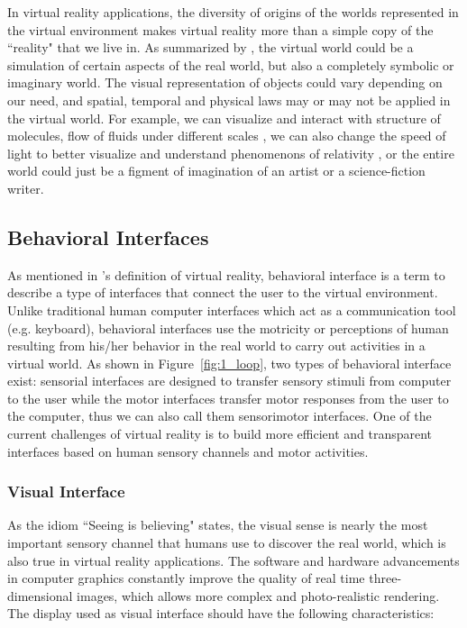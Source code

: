 In virtual reality applications, the diversity of origins of the worlds represented in the virtual environment makes virtual reality more than a simple copy of the ``reality" that we live in. As summarized by \citet{Fuchs2011Book}, the virtual world could be a simulation of certain aspects of the real world, but also a completely symbolic or imaginary world. The visual representation of objects could vary depending on our need, and spatial, temporal and physical laws may or may not be applied in the virtual world. For example, we can visualize and interact with structure of molecules, flow of fluids under different scales \citep{Ferey2009Multisensory, Bryson1996Virtual}, we can also change the speed of light to better visualize and understand phenomenons of relativity \citep{Doat2011NRP}, or the entire world could just be a figment of imagination of an artist or a science-fiction writer.


\subsection{Behavioral Interfaces}
As mentioned in \citet{Fuchs2011Book}'s definition of virtual reality, behavioral interface is a term to describe a type of interfaces that connect the user to the virtual environment. Unlike traditional human computer interfaces which act as a communication tool (e.g. keyboard), behavioral interfaces use the motricity or perceptions of human resulting from his/her behavior in the real world to carry out activities in a virtual world. As shown in Figure~\ref{fig:1_loop}, two types of behavioral interface exist: sensorial interfaces are designed to transfer sensory stimuli from computer to the user while the motor interfaces transfer motor responses from the user to the computer, thus we can also call them sensorimotor interfaces. One of the current challenges of virtual reality is to build more efficient and transparent interfaces based on human sensory channels and motor activities.

\subsubsection{Visual Interface}
\label{sec:visual_interface}
As the idiom ``Seeing is believing" states, the visual sense is nearly the most important sensory channel that humans use to discover the real world, which is also true in virtual reality applications. The software and hardware advancements in computer graphics constantly improve the quality of real time three-dimensional images, which allows more complex and photo-realistic rendering. The display used as visual interface should have the following characteristics:

